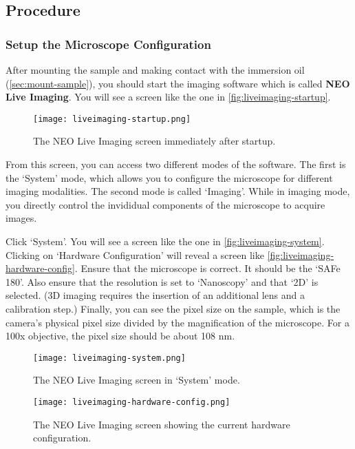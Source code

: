 \documentclass[10pt,a4paper,oneside]{book}
\begin{document}
\subsection{Procedure}

\subsubsection{Setup the Microscope Configuration}

After mounting the sample and making contact with the immersion oil (\autoref{sec:mount-sample}), you should start the imaging software which is called \textbf{NEO Live Imaging}. You will see a screen like the one in \autoref{fig:liveimaging-startup}.

\begin{figure}[ht]
    \centering
    \texttt{[image: liveimaging-startup.png]}
    \caption{The NEO Live Imaging screen immediately after startup.}
    \label{fig:liveimaging-startup}
\end{figure}

From this screen, you can access two different modes of the software. The first is the `System' mode, which allows you to configure the microscope for different imaging modalities. The second mode is called `Imaging'. While in imaging mode, you directly control the invididual components of the microscope to acquire images.

Click `System'. You will see a screen like the one in \autoref{fig:liveimaging-system}. Clicking on `Hardware Configuration' will reveal a screen like \autoref{fig:liveimaging-hardware-config}. Ensure that the microscope is correct. It should be the `SAFe 180'. Also ensure that the resolution is set to `Nanoscopy' and that `2D' is selected. (3D imaging requires the insertion of an additional lens and a calibration step.) Finally, you can see the pixel size on the sample, which is the camera's physical pixel size divided by the magnification of the microscope. For a 100x objective, the pixel size should be about 108 nm.

\begin{figure}[ht]
    \centering
    \texttt{[image: liveimaging-system.png]}
    \caption{The NEO Live Imaging screen in `System' mode.}
    \label{fig:liveimaging-system}
\end{figure}

\begin{figure}[ht]
    \centering
    \texttt{[image: liveimaging-hardware-config.png]}
    \caption{The NEO Live Imaging screen showing the current hardware configuration.}
    \label{fig:liveimaging-hardware-config}
\end{figure}
\end{document}
